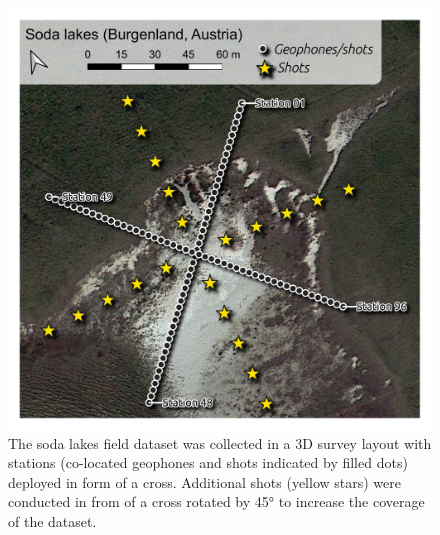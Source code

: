 \documentclass[a4paper,fleqn]{cas-sc}
\begin{document}
\begin{figure}
	\centering
	\includegraphics[width=.75\textwidth]{./figures/map_sodalakes.pdf}
	\caption{The soda lakes field dataset was collected in a 3D survey layout with stations (co-located geophones and shots indicated by filled dots) deployed in form of a cross. Additional shots (yellow stars) were conducted in from of a cross rotated by 45° to increase the coverage of the dataset.}
	\label{fig:map_sodalakes}
\end{figure}

\end{document}
